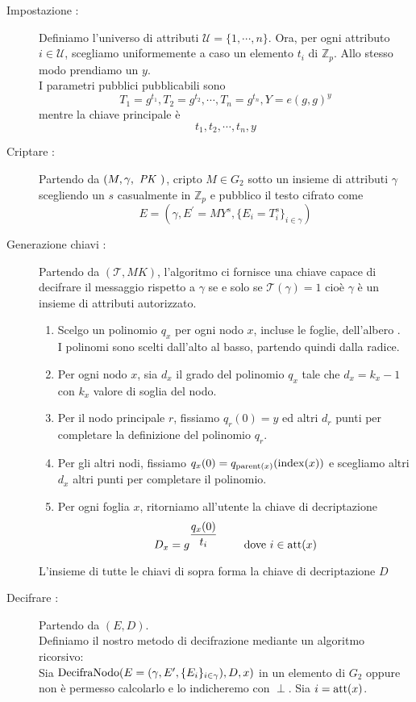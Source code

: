 \begin{description}
\item[Impostazione :]Definiamo l'universo di attributi $\mathcal{U} = \{1,\cdots,n\}$. Ora, per ogni attributo $i \in \mathcal{U}$, scegliamo uniformemente a caso un elemento $t_i$ di $\mathbb{Z}_p$. Allo stesso modo prendiamo un $y$.\\
I parametri pubblici \pk pubblicabili sono
\[ T_1 = g^{t_1} , T_2 = g^{t_2} , \cdots , T_n = g^{t_n} , Y = e(g,g)^y \]\label{pubchiavi}
mentre la chiave principale è
\[ t_1 , t_2 , \cdots , t_n , y \]
\item[Criptare :] Partendo da $(M , \gamma, \text{ \textit{PK} })$, cripto $M \in G_2$ sotto un insieme di attributi $\gamma$ scegliendo un $s$ casualmente in $\mathbb{Z}_p$ e pubblico il testo cifrato come
\[ E = (\gamma , E^\prime = MY^s , \{E_i = T_i^s \}_{i\in\gamma}) \]
\item[Generazione chiavi :] Partendo da $( \mathcal{T} , MK )$, l'algoritmo ci fornisce una chiave capace di decifrare il messaggio rispetto a $\gamma$ se e solo se $\mathcal{T}(\gamma) = 1$ cioè $\gamma$ è un insieme di attributi autorizzato.
\begin{enumerate}
\item Scelgo un polinomio $q_x$ per ogni nodo $x$, incluse le foglie, dell'albero .\\
I polinomi sono scelti dall'alto al basso, partendo quindi dalla radice.
\item Per ogni nodo $x$, sia $d_x$ il grado del polinomio $q_x$ tale che $d_x = k_x - 1$ con $k_x$ valore di soglia del nodo.
\item Per il nodo principale $r$, fissiamo $q_r(0) = y$ ed altri $d_r$ punti per completare la definizione del polinomio $q_r$.
\item Per gli altri nodi, fissiamo $q_x(0) = q_{\operatorname{parent}(x)}(\operatorname{index}(x))$ e scegliamo altri $d_x$ altri punti per completare il polinomio.
\item Per ogni foglia $x$, ritorniamo all'utente la chiave di decriptazione
\[ D_x = g^{\dfrac{q_x(0)}{t_i}} \qquad \text{ dove } i \in \operatorname{att}(x) \]
\end{enumerate}
L'insieme di tutte le chiavi di sopra forma la chiave di decriptazione $D$
\item[Decifrare :] Partendo da $(E,D)$.\\
Definiamo il nostro metodo di decifrazione mediante un algoritmo ricorsivo:\\
Sia $\operatorname{DecifraNodo}( E = (\gamma,E^\prime,\{E_i\}_{i\in \gamma}), D , x )$ in un elemento di $G_2$ oppure non è permesso calcolarlo e lo indicheremo con $\perp$. Sia $i = \operatorname{att}(x)$.

\end{description}
